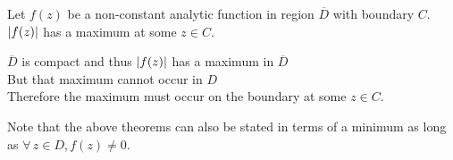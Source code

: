 \documentclass[letterpaper,12pt,fleqn]{article}
\begin{document}
\begin{corollary}
  Let $f(z)$ be a non-constant analytic function in region $\overline{D}$
  with boundary $C$. \\
  $\lvert f(z)\rvert$ has a maximum at some $z\in C$.
\end{corollary}

\begin{theproof}
  $\overline{D}$ is compact and thus $\lvert f(z)\rvert$ has a maximum in
  $\overline{D}$ \\
  But that maximum cannot occur in $D$ \\
  Therefore the maximum must occur on the boundary at some $z\in C$.
\end{theproof}
Note that the above theorems can also be stated in terms of a minimum as
long as $\forall\,z\in D,f(z)\ne0$.
\end{document}
